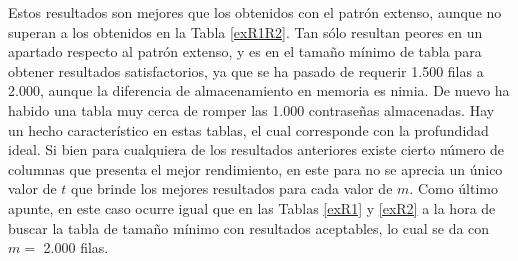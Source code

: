 \documentclass[12pt,spanish,listoffigures,listoftables]{tfgetsinf}
\begin{document}
\def\arraystretch{1.5}
\begin{table}[H]
	\centering
	\caption{Porcentajes de éxito para las tablas que emplean patrón reducido}
	\label{expp}
\end{table}

Estos resultados son mejores que los obtenidos con el patrón extenso, aunque no superan a los obtenidos en la Tabla \ref{exR1R2}. Tan sólo resultan peores en un apartado respecto al patrón extenso, y es en el tamaño mínimo de tabla para obtener resultados satisfactorios, ya que se ha pasado de requerir 1.500 filas a 2.000, aunque la diferencia de almacenamiento en memoria es nimia. De nuevo ha habido una tabla muy cerca de romper las 1.000 contraseñas almacenadas. Hay un hecho característico en estas tablas, el cual corresponde con la profundidad ideal. Si bien para cualquiera de los resultados anteriores existe cierto número de columnas que presenta el mejor rendimiento, en este para no se aprecia un único valor de $t$ que brinde los mejores resultados para cada valor de $m$. Como último apunte, en este caso ocurre igual que en las Tablas \ref{exR1} y \ref{exR2} a la hora de buscar la tabla de tamaño mínimo con resultados aceptables, lo cual se da con $m =$ 2.000 filas.
\end{document}
